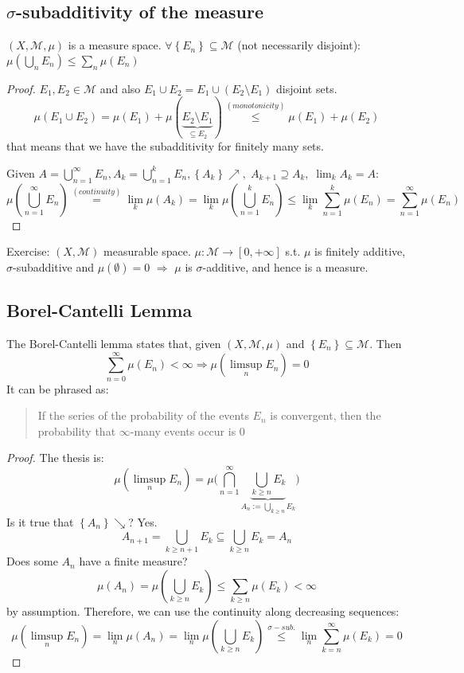 \subsection{\texorpdfstring{\(\sigma\)}{sigma}-subadditivity of the measure}
\begin{theorem}
\((X, \mathcal{M}, \mu)\) is a measure space. \(\forall \left\lbrace E_n \right\rbrace \subseteq \mathcal{M}\) (not necessarily disjoint): \(\mu\left(\bigcup_n E_n\right) \leq \sum_n \mu(E_n)\)
\end{theorem}
\begin{proof}
    \(E_1, E_2 \in \mathcal{M}\) and also \(E_1 \cup E_2 = E_1 \cup (E_2 \setminus E_1)\) disjoint sets.
    \[
        \mu(E_1 \cup E_2) = \mu(E_1) + \mu(\underbrace{E_2 \setminus E_1}_{\subseteq E_2}) \overset{(monotonicity)}{\leq} \mu(E_1) + \mu(E_2)
    \]
    that means that we have the subadditivity for finitely many sets.

    \noindent Given \(
        A = \bigcup_{n=1}^{\infty} E_n, A_k = \bigcup_{n = 1}^{k} E_n,
        \left\lbrace A_k \right\rbrace \nearrow, \; A_{k+1} \supseteq A_k, \; \lim_k A_k = A:
    \)
    \[
        \mu\left(\bigcup_{n = 1}^{\infty} E_n\right) \overset{(continuity)}{=} \lim_k \mu(A_k) = \lim_k \mu \left(\bigcup_{n=1}^{k} E_n\right) \leq \lim_k \sum_{n=1}^k \mu(E_n) = \sum_{n = 1}^{\infty} \mu(E_n)
\]
\end{proof}
Exercise: \((X, \mathcal{M})\) measurable space. \(\mu : \mathcal{M} \to [0, +\infty]\) s.t. \(\mu\) is finitely additive, \(\sigma\)-subadditive and \(\mu(\emptyset) = 0\) \(\Rightarrow\) \(\mu\) is \(\sigma\)-additive, and hence is a measure.  
\subsection{Borel-Cantelli Lemma}
The Borel-Cantelli lemma states that, given \((X, \mathcal{M}, \mu)\) and \(\left\lbrace E_n \right\rbrace \subseteq \mathcal{M}\). Then
\[
    \sum_{n=0}^{\infty} \mu(E_n) < \infty \Rightarrow \mu(\limsup_n E_n) = 0
\]
It can be phrased as: \begin{quote}
    If the series of the probability of the events \(E_n\) is convergent, then the probability that \(\infty\)-many events occur is \(0\)
\end{quote}
\begin{proof}
    The thesis is: \[\mu(\limsup_n E_n) = \mu\biggl(\bigcap_{n=1}^{\infty} \underbrace{\bigcup_{k \geq n} E_k}_{A_n := \bigcup_{k\geq n}E_k}\biggr)\]
    Is it true that \(\left\lbrace A_n \right\rbrace \searrow\)? Yes.
    \[
         A_{n+1} = \bigcup_{k \geq n+1}  E_k \subseteq \bigcup_{k \geq n} E_k = A_n
    \]
    Does some \(A_n\) have a finite measure? 
    \[
        \mu(A_n) = \mu\left(\bigcup_{k \geq n} E_k\right) \leq \sum_{k \geq n} \mu(E_k) < \infty
    \]
    by assumption. Therefore, we can use the continuity along decreasing sequences: 
    \[
        \mu(\limsup_n E_n) = \lim_n \mu(A_n) = \lim_n \mu \left(\bigcup_{k \geq n} E_k\right) \overset{\sigma-sub.}{\leq} \lim_n \sum_{k=n}^{\infty} \mu(E_k) = 0
    \]
\end{proof}
